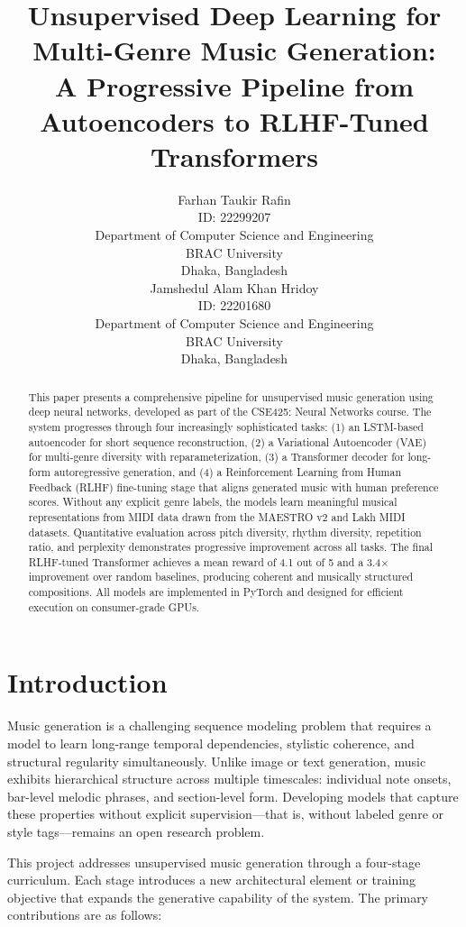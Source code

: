 \documentclass{article}
\title{Unsupervised Deep Learning for Multi-Genre Music Generation:\\
A Progressive Pipeline from Autoencoders to RLHF-Tuned Transformers}
\author{%
  Farhan Taukir Rafin \\
  ID: 22299207 \\
  Department of Computer Science and Engineering \\
  BRAC University \\
  Dhaka, Bangladesh \\
  \And
  Jamshedul Alam Khan Hridoy \\
  ID: 22201680 \\
  Department of Computer Science and Engineering \\
  BRAC University \\
  Dhaka, Bangladesh \\
}
\begin{document}
\maketitle

\begin{abstract}
This paper presents a comprehensive pipeline for unsupervised music generation using deep neural networks, developed as part of the CSE425: Neural Networks course. The system progresses through four increasingly sophisticated tasks: (1) an LSTM-based autoencoder for short sequence reconstruction, (2) a Variational Autoencoder (VAE) for multi-genre diversity with reparameterization, (3) a Transformer decoder for long-form autoregressive generation, and (4) a Reinforcement Learning from Human Feedback (RLHF) fine-tuning stage that aligns generated music with human preference scores. Without any explicit genre labels, the models learn meaningful musical representations from MIDI data drawn from the MAESTRO v2 and Lakh MIDI datasets. Quantitative evaluation across pitch diversity, rhythm diversity, repetition ratio, and perplexity demonstrates progressive improvement across all tasks. The final RLHF-tuned Transformer achieves a mean reward of 4.1 out of 5 and a 3.4$\times$ improvement over random baselines, producing coherent and musically structured compositions. All models are implemented in PyTorch and designed for efficient execution on consumer-grade GPUs.
\end{abstract}

\section{Introduction}

Music generation is a challenging sequence modeling problem that requires a model to learn long-range temporal dependencies, stylistic coherence, and structural regularity simultaneously. Unlike image or text generation, music exhibits hierarchical structure across multiple timescales: individual note onsets, bar-level melodic phrases, and section-level form. Developing models that capture these properties without explicit supervision—that is, without labeled genre or style tags—remains an open research problem.

This project addresses unsupervised music generation through a four-stage curriculum. Each stage introduces a new architectural element or training objective that expands the generative capability of the system. The primary contributions are as follows:
\end{document}
